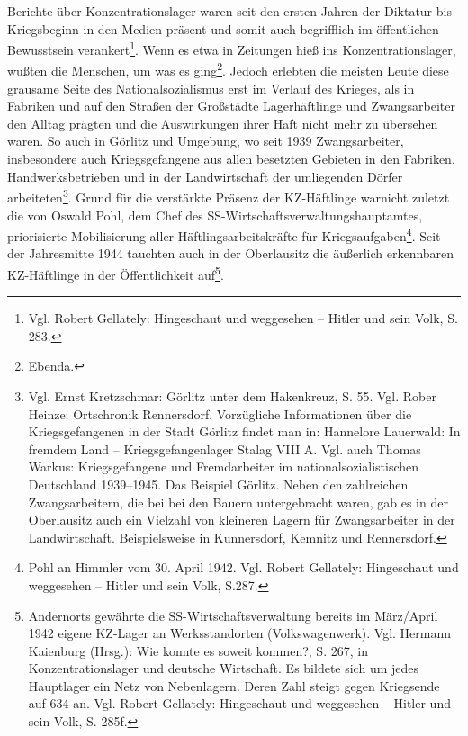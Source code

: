 Berichte über Konzentrationslager waren seit den ersten Jahren der Diktatur bis Kriegsbeginn in den Medien präsent und somit auch begrifflich im öffentlichen Bewusstsein verankert\footnote{Vgl. Robert Gellately: Hingeschaut und weggesehen -- Hitler und sein Volk, S. 283.}. Wenn es etwa in Zeitungen hieß \glqq ins Konzentrationslager\grqq, wußten die Menschen, um was es ging\footnote{Ebenda.}. Jedoch erlebten die meisten Leute diese grausame Seite des Nationalsozialismus erst im Verlauf des Krieges, als in Fabriken und auf den Straßen der Großstädte Lagerhäftlinge und Zwangsarbeiter den Alltag prägten und die Auswirkungen ihrer Haft nicht mehr zu übersehen waren. So auch in Görlitz und Umgebung, wo seit 1939 Zwangsarbeiter, insbesondere auch Kriegsgefangene aus allen besetzten Gebieten in den Fabriken, Handwerksbetrieben und in der Landwirtschaft der umliegenden Dörfer arbeiteten\footnote{Vgl. Ernst Kretzschmar: Görlitz unter dem Hakenkreuz, S. 55. Vgl. Rober Heinze: Ortschronik Rennersdorf. Vorzügliche Informationen über die Kriegsgefangenen in der Stadt Görlitz findet man in: Hannelore Lauerwald: In fremdem Land -- Kriegsgefangenlager Stalag VIII A. Vgl. auch Thomas Warkus: Kriegsgefangene und Fremdarbeiter im nationalsozialistischen Deutschland 1939--1945. Das Beispiel Görlitz. Neben den zahlreichen Zwangsarbeitern, die bei bei den Bauern untergebracht waren, gab es in der Oberlausitz auch ein Vielzahl von kleineren Lagern für Zwangsarbeiter in der Landwirtschaft. Beispielsweise in Kunnersdorf, Kemnitz und Rennersdorf.}. Grund für die verstärkte Präsenz der KZ-Häftlinge war\linebreak\newpage nicht zuletzt die von Oswald Pohl, dem Chef des SS-Wirtschaftsverwaltungshauptamtes, priorisierte Mobilisierung aller Häftlingsarbeitskräfte für Kriegsaufgaben\footnote{Pohl an Himmler vom 30. April 1942. Vgl. Robert Gellately: Hingeschaut und weggesehen -- Hitler und sein Volk, S.287.}.
Seit der Jahresmitte 1944 tauchten auch in der Oberlausitz die äußerlich erkennbaren KZ-Häftlinge in der Öffentlichkeit auf\footnote{Andernorts gewährte die SS-Wirtschaftsverwaltung bereits im März/April 1942 eigene KZ-Lager an Werksstandorten (Volkswagenwerk). Vgl. Hermann Kaienburg (Hrsg.): Wie konnte es soweit kommen?, S. 267, in Konzentrationslager und deutsche Wirtschaft. Es bildete sich um jedes Hauptlager ein Netz von Nebenlagern. Deren Zahl steigt gegen Kriegsende auf 634 an. Vgl. Robert Gellately: Hingeschaut und weggesehen -- Hitler und sein Volk, S. 285f.}.\newline

